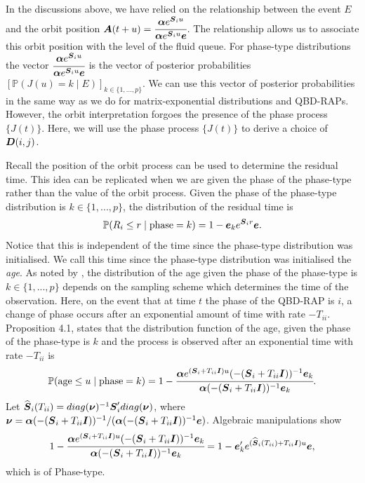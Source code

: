 In the discussions above, we have relied on the relationship between the event \(E\) and the orbit position \(\displaystyle \boldsymbol A(t+u) = \cfrac{\boldsymbol\alpha e^{\boldsymbol S_iu} }{\boldsymbol\alpha e^{\boldsymbol S_iu } \boldsymbol e}\). The relationship allows us to associate this orbit position with the level of the fluid queue. For phase-type distributions the vector \(\cfrac{\boldsymbol\alpha e^{\boldsymbol S_iu} }{\boldsymbol\alpha e^{\boldsymbol S_iu } \boldsymbol e}\) is the vector of posterior probabilities \(\left[\mathbb P(J(u)=k \mid E)\right]_{k\in\{1,...,p\}}\). We can use this vector of posterior probabilities in the same way as we do for matrix-exponential distributions and QBD-RAPs. However, the orbit interpretation forgoes the presence of the phase process \(\{J(t)\}\). Here, we will use the phase process \(\{J(t)\}\) to derive a choice of \(\boldsymbol D(i,j)\). 

Recall the position of the orbit process can be used to determine the residual time. This idea can be replicated when we are given the phase of the phase-type rather than the value of the orbit process. Given the phase of the phase-type distribution is \(k\in\{1,...,p\}\), the distribution of the residual time is 
\[\mathbb P(R_i\leq r \mid \mbox{phase}=k)=1-\boldsymbol e_k e^{\boldsymbol S_i r}\boldsymbol e.\]
Notice that this is independent of the time since the phase-type distribution was initialised. We call this time since the phase-type distribution was initialised the \emph{age}. As noted by \cite{hmp2017}, the distribution of the age given the phase of the phase-type is \(k\in\{1,...,p\}\) depends on the sampling scheme which determines the time of the observation. Here, on the event that at time \(t\) the phase of the QBD-RAP is \(i\), a change of phase occurs after an exponential amount of time with rate \(-T_{ii}\). Proposition 4.1, \cite{hmp2017} states that the distribution function of the age, given the phase of the phase-type is \(k\) and the process is observed after an exponential time with rate \(-T_{ii}\) is 
\[\mathbb P(\mbox{age}\leq u \mid \mbox{phase}=k )=1-\cfrac{\boldsymbol \alpha e^{(\boldsymbol S_i + T_{ii}\boldsymbol I)u}(-(\boldsymbol S_i+ T_{ii}\boldsymbol I))^{-1}\boldsymbol e_k}{\boldsymbol \alpha (-(\boldsymbol S_i+ T_{ii}\boldsymbol I))^{-1}\boldsymbol e_k}.\]
Let \(\widehat{ \boldsymbol S}_i(T_{ii}) = diag(\boldsymbol \nu)^{-1}\boldsymbol S_i'diag(\boldsymbol \nu)\), where \(\boldsymbol \nu = \boldsymbol\alpha(-(\boldsymbol S_i+ T_{ii}\boldsymbol I))^{-1}/(\boldsymbol\alpha(-(\boldsymbol S_i+ T_{ii}\boldsymbol I))^{-1}\boldsymbol e)\). Algebraic manipulations show
\begin{align}
	1-\cfrac{\boldsymbol \alpha e^{(\boldsymbol S_i + T_{ii}\boldsymbol I)u}(-(\boldsymbol S_i+ T_{ii}\boldsymbol I))^{-1}\boldsymbol e_k}{\boldsymbol \alpha (-(\boldsymbol S_i+ T_{ii}\boldsymbol I))^{-1}\boldsymbol e_k}
	= 1-\boldsymbol e_k' e^{(\widehat{\boldsymbol S}_i(T_{ii}) + T_{ii}\boldsymbol I)u} \boldsymbol e,\label{eqn: skgj}
\end{align}
which is of Phase-type. 

